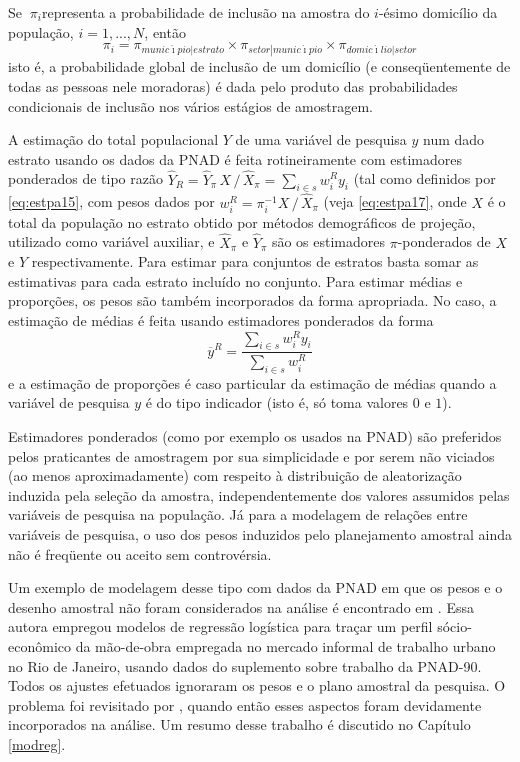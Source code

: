 \documentclass[]{book}
\numberwithin{example}{chapter}
\numberwithin{remark}{chapter}
\numberwithin{definition}{chapter}
\begin{document}
Se \({\ \pi }_{i}\)representa a probabilidade de inclusão na amostra do
\(i\)-ésimo domicílio da população, \(i=1,...,N\), então \[
\pi _{i}=\pi _{munic\acute{\imath}pio\left| estrato\right. }\times \pi
_{setor\left| munic\acute{\imath}pio\right. }\times \pi _{domic\acute{\imath}
lio\left| setor\right. } 
\] isto é, a probabilidade global de inclusão de um domicílio (e
conseqüentemente de todas as pessoas nele moradoras) é dada pelo produto
das probabilidades condicionais de inclusão nos vários estágios de
amostragem.

A estimação do total populacional \(Y\) de uma variável de pesquisa
\(y\) num dado estrato usando os dados da PNAD é feita rotineiramente
com estimadores ponderados de tipo razão
\(\widehat{Y}_{R}=\widehat{Y}_{\pi }\,X\,/\,\widehat{X}_{\pi }=\sum_{i\in s}w_{i}^{R}y_{i}\)
(tal como definidos por \eqref{eq:estpa15}, com pesos dados por
\(w_{i}^{R}=\pi_{i}^{-1}X\,/\,\widehat{X}_{\pi }\) (veja
\eqref{eq:estpa17}, onde \(X\) é o total da população no estrato obtido
por métodos demográficos de projeção, utilizado como variável auxiliar,
e \(\widehat{X}_{\pi}\) e \(\widehat{Y}_{\pi}\) são os estimadores
\(\pi\)-ponderados de \(X\) e \(Y\) respectivamente. Para estimar para
conjuntos de estratos basta somar as estimativas para cada estrato
incluído no conjunto. Para estimar médias e proporções, os pesos são
também incorporados da forma apropriada. No caso, a estimação de médias
é feita usando estimadores ponderados da forma \[
\overline{y}^{R}=\frac{\sum_{i\in s}w_{i}^{R}y_{i}}{\sum_{i\in s}w_{i}^{R}} 
\] e a estimação de proporções é caso particular da estimação de médias
quando a variável de pesquisa \(y\) é do tipo indicador (isto é, só toma
valores \(0\) e \(1\)).

Estimadores ponderados (como por exemplo os usados na PNAD) são
preferidos pelos praticantes de amostragem por sua simplicidade e por
serem não viciados (ao menos aproximadamente) com respeito à
distribuição de aleatorização induzida pela seleção da amostra,
independentemente dos valores assumidos pelas variáveis de pesquisa na
população. Já para a modelagem de relações entre variáveis de pesquisa,
o uso dos pesos induzidos pelo planejamento amostral ainda não é
freqüente ou aceito sem controvérsia.

Um exemplo de modelagem desse tipo com dados da PNAD em que os pesos e o
desenho amostral não foram considerados na análise é encontrado em
\citep{Leote}. Essa autora empregou modelos de regressão logística para
traçar um perfil sócio-econômico da mão-de-obra empregada no mercado
informal de trabalho urbano no Rio de Janeiro, usando dados do
suplemento sobre trabalho da PNAD-90. Todos os ajustes efetuados
ignoraram os pesos e o plano amostral da pesquisa. O problema foi
revisitado por \citep{Pessoa}, quando então esses aspectos foram
devidamente incorporados na análise. Um resumo desse trabalho é
discutido no Capítulo \ref{modreg}.
\end{document}
